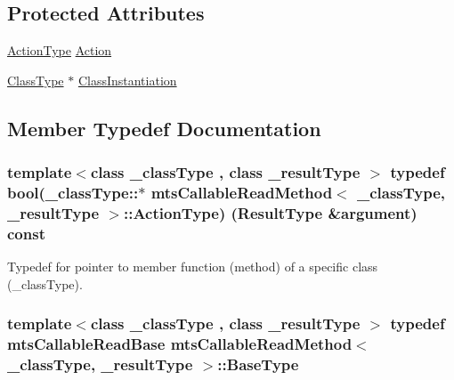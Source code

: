 \subsection*{Protected Attributes}
\begin{DoxyCompactItemize}
\item 
\hyperlink{classmts_callable_read_method_a9e05546d6f486e77f1df0c2b079dd7e1}{Action\+Type} \hyperlink{classmts_callable_read_method_af163759634008d6c6c16a079d78b525d}{Action}
\item 
\hyperlink{classmts_callable_read_method_a44650138085a29d60a4f3cb3616abbbf}{Class\+Type} $\ast$ \hyperlink{classmts_callable_read_method_ae3a9299dd267fc9c88d97769a09a6397}{Class\+Instantiation}
\end{DoxyCompactItemize}


\subsection{Member Typedef Documentation}
\hypertarget{classmts_callable_read_method_a9e05546d6f486e77f1df0c2b079dd7e1}{}
\subsubsection[{Action\+Type}]{\setlength{\rightskip}{0pt plus 5cm}template$<$class \+\_\+class\+Type , class \+\_\+result\+Type $>$ typedef bool(\+\_\+class\+Type\+::$\ast$ {\bf mts\+Callable\+Read\+Method}$<$ \+\_\+class\+Type, \+\_\+result\+Type $>$\+::Action\+Type) ({\bf Result\+Type} \&argument) const }\label{classmts_callable_read_method_a9e05546d6f486e77f1df0c2b079dd7e1}
Typedef for pointer to member function (method) of a specific class (\+\_\+class\+Type). \hypertarget{classmts_callable_read_method_a83876b0239f91889b077ab015b11f297}{}
\subsubsection[{Base\+Type}]{\setlength{\rightskip}{0pt plus 5cm}template$<$class \+\_\+class\+Type , class \+\_\+result\+Type $>$ typedef {\bf mts\+Callable\+Read\+Base} {\bf mts\+Callable\+Read\+Method}$<$ \+\_\+class\+Type, \+\_\+result\+Type $>$\+::{\bf Base\+Type}}\label{classmts_callable_read_method_a83876b0239f91889b077ab015b11f297}
\hypertarget{classmts_callable_read_method_a44650138085a29d60a4f3cb3616abbbf}{}
